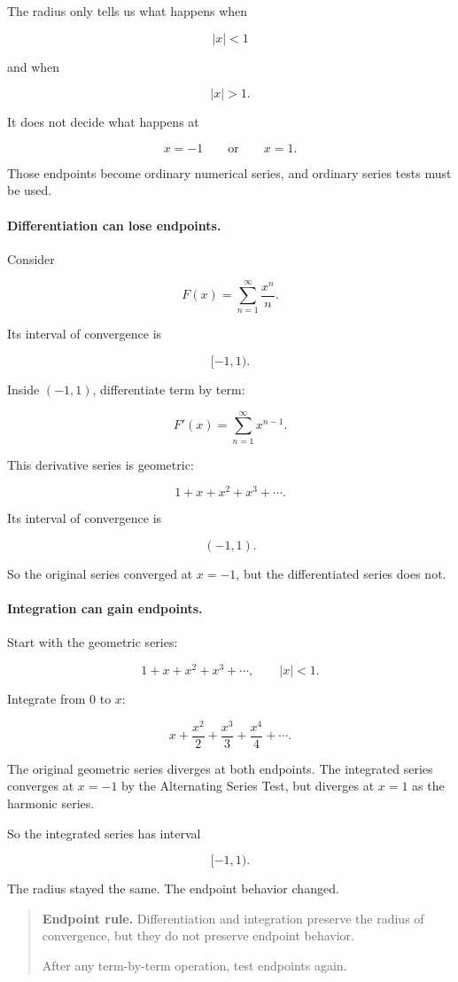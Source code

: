The radius only tells us what happens when

\[
|x|<1
\]

and when

\[
|x|>1.
\]

It does not decide what happens at

\[
x=-1
\qquad\text{or}\qquad
x=1.
\]

Those endpoints become ordinary numerical series, and ordinary series tests must be
used.

\paragraph{Differentiation can lose endpoints.}
Consider

\[
F(x)=\sum_{n=1}^{\infty}\frac{x^n}{n}.
\]

Its interval of convergence is

\[
[-1,1).
\]

Inside \((-1,1)\), differentiate term by term:

\[
F'(x)=\sum_{n=1}^{\infty}x^{n-1}.
\]

This derivative series is geometric:

\[
1+x+x^2+x^3+\cdots.
\]

Its interval of convergence is

\[
(-1,1).
\]

So the original series converged at \(x=-1\), but the differentiated series does not.

\paragraph{Integration can gain endpoints.}
Start with the geometric series:

\[
1+x+x^2+x^3+\cdots,
\qquad |x|<1.
\]

Integrate from \(0\) to \(x\):

\[
x+\frac{x^2}{2}+\frac{x^3}{3}+\frac{x^4}{4}+\cdots.
\]

The original geometric series diverges at both endpoints.  The integrated series
converges at \(x=-1\) by the Alternating Series Test, but diverges at \(x=1\) as the
harmonic series.

So the integrated series has interval

\[
[-1,1).
\]

The radius stayed the same.  The endpoint behavior changed.

\begin{quote}
\textbf{Endpoint rule.}
Differentiation and integration preserve the radius of convergence, but they do not
preserve endpoint behavior.

After any term-by-term operation, test endpoints again.
\end{quote}

